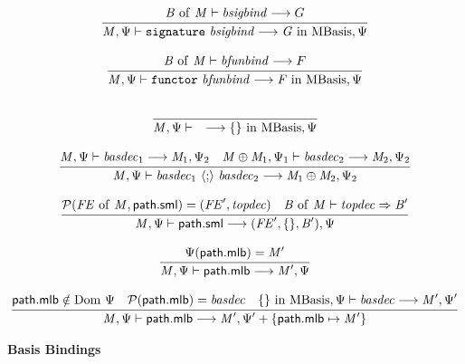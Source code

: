 \begin{equation}
{\frac{\displaystyle\strut{
\mathit{B}~\mathrm{of}~\mathit{M} \vdash \mathit{bsigbind} \longrightarrow G
}}{\displaystyle\strut{
\mathit{M}, \Psi  \vdash \mathtt{signature}~ \mathit{bsigbind}
\longrightarrow \mathit{G } ~\mathrm{in}~ \mathrm{MBasis}, \Psi
}}}
\end{equation}

\begin{equation}
{\frac{\displaystyle\strut{
\mathit{B}~\mathrm{of}~\mathit{M} \vdash \mathit{bfunbind} \longrightarrow F
}}{\displaystyle\strut{
\mathit{M}, \Psi  \vdash \mathtt{functor}~ \mathit{bfunbind}
\longrightarrow \mathit{F} ~\mathrm{in}~ \mathrm{MBasis}, \Psi
}}}
\end{equation}

\begin{equation}
{\frac{\displaystyle\strut{
}}{\displaystyle\strut{
\mathit{M}, \Psi  \vdash \quad \longrightarrow \{\} ~\mathrm{in}~ \mathrm{MBasis}, \Psi
}}}
\end{equation}

\begin{equation}
{\frac{\displaystyle\strut{
\mathit{M}, \Psi  \vdash \mathit{basdec}_1 \longrightarrow \mathit{M}_1, \Psi_2 \quad
\mathit{M} \oplus \mathit{M}_1, \Psi_1  \vdash \mathit{basdec}_2 \longrightarrow \mathit{M}_2, \Psi_2 
}}{\displaystyle\strut{
\mathit{M}, \Psi  \vdash \mathit{basdec}_1 ~\langle\mathtt{;}\rangle~ \mathit{basdec}_2 \longrightarrow \mathit{M}_1 \oplus \mathit{M}_2, \Psi_2
}}}
\end{equation}

\begin{equation}
{\frac{\displaystyle\strut{
\mathcal{P}(\mathit{FE}~\mathrm{of}~\mathit{M}, \mathsf{path.sml}) = (\mathit{FE}', \mathit{topdec}) \quad
\mathit{B}~\mathrm{of}~\mathit{M} \vdash \mathit{topdec} \Rightarrow \mathit{B}'
}}{\displaystyle\strut{
\mathit{M}, \Psi  \vdash \mathsf{path.sml}  \longrightarrow (\mathit{FE}',\{\},\mathit{B}'), \Psi
}}}
\end{equation}

\begin{equation}
{\frac{\displaystyle\strut{
\Psi(\mathsf{path.mlb}) = \mathit{M}'
}}{\displaystyle\strut{
\mathit{M}, \Psi  \vdash \mathsf{path.mlb}  \longrightarrow \mathit{M}', \Psi
}}}
\end{equation}

\begin{equation}
{\frac{\displaystyle\strut{
\mathsf{path.mlb} \notin \mathrm{Dom}~\Psi \quad
\mathcal{P}(\mathsf{path.mlb}) = \mathit{basdec} \quad
\{\} ~\mathrm{in}~ \mathrm{MBasis}, \Psi  \vdash \mathit{basdec} \longrightarrow \mathit{M}', \Psi'
}}{\displaystyle\strut{
\mathit{M}, \Psi  \vdash \mathsf{path.mlb}  \longrightarrow \mathit{M}', \Psi' + \{\mathsf{path.mlb} \mapsto \mathit{M}'\} 
}}}
\end{equation}

{\large\noindent
\textbf{Basis Bindings} \hfill 
{}
}

